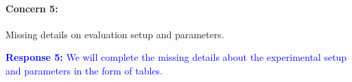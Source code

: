 \documentclass[12pt,one-column]{article}
\begin{document}

{\it \paragraph{Concern 5:}Missing details on evaluation setup and parameters.}


\noindent\textcolor{blue}{\textbf{Response 5:}
We will complete the missing details about the experimental setup and parameters in the form of tables.
}
	
\end{document}
